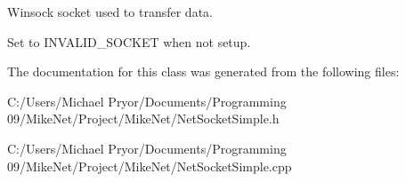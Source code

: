 Winsock socket used to transfer data. 

Set to INVALID\_\-SOCKET when not setup. 

The documentation for this class was generated from the following files:\begin{DoxyCompactItemize}
\item 
C:/Users/Michael Pryor/Documents/Programming 09/MikeNet/Project/MikeNet/NetSocketSimple.h\item 
C:/Users/Michael Pryor/Documents/Programming 09/MikeNet/Project/MikeNet/NetSocketSimple.cpp\end{DoxyCompactItemize}
